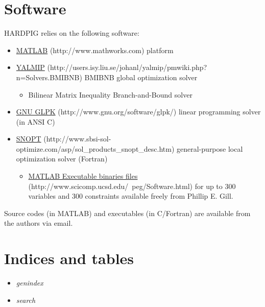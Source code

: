 \documentclass[a4paper,10pt,english]{sphinxmanual}
\begin{document}
\begin{DUlineblock}{0em}
\item[] 
\item[] 
\item[] 
\end{DUlineblock}


\chapter{Software}
\label{index:software}
HARDPIG relies on the following software:
\begin{itemize}
\item {} 
\href{http://www.mathworks.com}{MATLAB} (http://www.mathworks.com) platform

\item {} 
\href{http://users.isy.liu.se/johanl/yalmip/pmwiki.php?n=Solvers.BMIBNB}{YALMIP} (http://users.isy.liu.se/johanl/yalmip/pmwiki.php?n=Solvers.BMIBNB) BMIBNB global optimization solver
\begin{itemize}
\item {} 
Bilinear Matrix Inequality Branch-and-Bound solver

\end{itemize}

\item {} 
\href{http://www.gnu.org/software/glpk/}{GNU GLPK} (http://www.gnu.org/software/glpk/) linear programming
solver (in ANSI C)

\item {} 
\href{http://www.sbsi-sol-optimize.com/asp/sol\_products\_snopt\_desc.htm}{SNOPT} (http://www.sbsi-sol-optimize.com/asp/sol\_products\_snopt\_desc.htm) general-purpose local optimization solver (Fortran)
\begin{itemize}
\item {} 
\href{http://www.scicomp.ucsd.edu/~peg/Software.html}{MATLAB Executable binaries files} (http://www.scicomp.ucsd.edu/~peg/Software.html) for up to 300 variables and 300 constraints available freely from Phillip E. Gill.

\end{itemize}

\end{itemize}

Source codes (in MATLAB) and executables (in C/Fortran) are available from the authors via email.


\chapter{Indices and tables}
\label{index:indices-and-tables}\begin{itemize}
\item {} 
\emph{genindex}

\item {} 
\emph{search}

\end{itemize}
\end{document}
